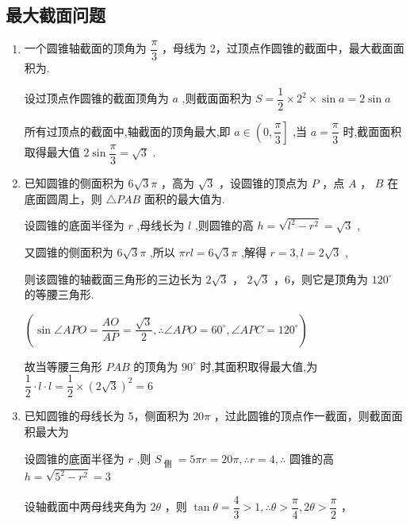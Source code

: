 \subsection*{最大截面问题}
\begin{enumerate}
    \item 一个圆锥轴截面的顶角为 $\dfrac{\pi }{3}$ ，母线为 2，过顶点作圆锥的截面中，最大截面面积为.
    \begin{jieda}
        设过顶点作圆锥的截面顶角为 $a$ ,则截面面积为 $S = \dfrac{1}{2} \times  {2}^{2} \times  \sin a = 2\sin a$
        
        所有过顶点的截面中,轴截面的顶角最大,即 $a \in  \left( {0,\dfrac{\pi }{3}}\right\rbrack$ ,当 $a = \dfrac{\pi }{3}$ 时,截面面积取得最大值 $2\sin \dfrac{\pi }{3} = \sqrt{3}$ .
    \end{jieda}
    
    \item 已知圆锥的侧面积为 $6\sqrt{3}\pi$ ，高为 $\sqrt{3}$ ，设圆锥的顶点为 $P$ ，点 $A$ ， $B$ 在底面圆周上，则 $\bigtriangleup  {PAB}$ 面积的最大值为.
    \begin{jieda}
        设圆锥的底面半径为 $r$ ,母线长为 $l$ ,则圆锥的高 $h = \sqrt{{l}^{2} - {r}^{2}} = \sqrt{3}$ ,

        又圆锥的侧面积为 $6\sqrt{3}\pi$ ,所以 ${\pi rl} = 6\sqrt{3}\pi$ ,解得 $r = 3,l = 2\sqrt{3}$ ,
        
        则该圆锥的轴截面三角形的三边长为 $2\sqrt{3}$ ， $2\sqrt{3}$ ，6，则它是顶角为 ${120}^{ \circ  }$ 的等腰三角形.
        
        $\left( {\sin \angle {APO} = \dfrac{AO}{AP} = \dfrac{\sqrt{3}}{2},\therefore \angle {APO} = {60}^{ \circ  },\angle {APC} = {120}^{ \circ  }}\right)$
        
        故当等腰三角形 ${PAB}$ 的顶角为 ${90}^{ \circ  }$ 时,其面积取得最大值,为 $\dfrac{1}{2} \cdot  l \cdot  l = \dfrac{1}{2} \times  {\left( 2\sqrt{3}\right) }^{2} = 6$
    \end{jieda}

    \item 已知圆锥的母线长为 5，侧面积为 ${20\pi }$ ，过此圆锥的顶点作一截面，则截面面积最大为
    \begin{jieda}
        设圆锥的底面半径为 $r$ ,则 ${S}_{\text{ 侧 }} = {5\pi r} = {20\pi },\therefore r = 4,\therefore$ 圆锥的高 $h = \sqrt{{5}^{2} - {r}^{2}} = 3$
        
        设轴截面中两母线夹角为 ${2\theta }$ ，则 $\tan \theta  = \dfrac{4}{3} > 1,\therefore \theta  > \dfrac{\pi }{4},{2\theta } > \dfrac{\pi }{2}$ ，
        

\end{jieda}
\end{enumerate}
